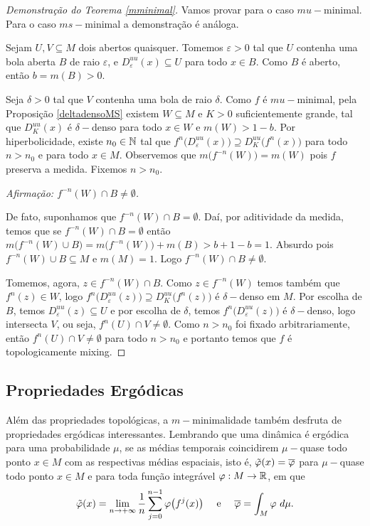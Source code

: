 \begin{proof}[Demonstração do Teorema \ref{mminimal}] Vamos provar para o caso $mu-$minimal. Para o caso $ms-$mi\-ni\-mal a demonstração é análoga.

Sejam $U,V\subseteq M$ dois abertos quaisquer. Tomemos $\varepsilon>0$ tal que $U$ contenha uma bola aberta $B$ de raio $\varepsilon$, e $D^{uu}_{\varepsilon}(x)\subseteq U$ para todo $x\in B$. Como $B$ é aberto, então $b=m(B)>0$.

Seja $\delta>0$ tal que $V$ contenha uma bola de raio $\delta$. Como $f$ é $mu-$minimal, pela Proposição \ref{deltadensoMS} existem $W\subseteq M$ e $K>0$ suficientemente grande, tal que $D^{uu}_{K}(x)$ é $\delta-$denso para todo $x\in W$ e $m(W)>1-b$. Por hiperbolicidade, existe $n_0\in\mathbb{N}$ tal que $f^{n}\big(D^{uu}_{\varepsilon}(x)\big)\supseteq D^{uu}_{K}\big(f^n(x)\big)$ para todo $n>n_0$ e para todo $x\in M$. Observemos que $m\big(f^{-n}(W)\big)=m(W)$ pois $f$ preserva a medida. Fixemos $n>n_0$.

\textit{Afirmação: $f^{-n}(W)\cap B\neq\emptyset$.} 

De fato, suponhamos que $f^{-n}(W)\cap B=\emptyset$. Daí, por aditividade da medida, temos que se $f^{-n}(W)\cap B=\emptyset$ então $m\big(f^{-n}(W)\cup B\big)=m\big(f^{-n}(W)\big)+m(B)>b+1-b=1$. Absurdo pois $f^{-n}(W)\cup B\subseteq M$ e $m(M)=1$. Logo $f^{-n}(W)\cap B\neq\emptyset$. 

Tomemos, agora, $z\in f^{-n}(W)\cap B$. Como $z\in f^{-n}(W)$ temos também que $f^n(z)\in W$, logo $f^{n}\big(D^{uu}_{\varepsilon}(z)\big)\supseteq D^{uu}_{K}\big(f^{n}(z)\big)$ é $\delta-$denso em $M$. Por escolha de $B$, temos $D^{uu}_{\varepsilon}(z)\subseteq U$ e por escolha de $\delta$, temos $f^{n}\big(D^{uu}_{\varepsilon}(z)\big)$ é $\delta-$denso, logo intersecta $V$, ou seja, $f^n(U)\cap V\neq\emptyset$. Como $n>n_0$ foi fixado arbitrariamente, então $f^n(U)\cap V\neq\emptyset$ para todo $n>n_0$ e portanto temos que $f$ é topologicamente mixing.
\end{proof}

\subsection{Propriedades Ergódicas}

Além das propriedades topológicas, a $m-$minimalidade também desfruta de propriedades ergódicas interessantes. Lembrando que uma dinâmica é ergódica para uma probabilidade $\mu$, se as médias temporais coincidirem $\mu-$quase todo ponto $x\in M$ com as respectivas médias espaciais, isto é, $\tilde{\varphi}(x)=\overline{\varphi}$ para $\mu-$quase todo ponto $x\in M$ e para toda função integrável $\varphi:M\to\mathbb{R}$, em que 
\begin{equation*}
\tilde{\varphi}(x)=\lim_{n\to+\infty}\dfrac{1}{n}\sum_{j=0}^{n-1}{\varphi\big(f^j(x)\big)}\quad\text{ e }\quad \overline{\varphi}=\int_{M}\varphi\ d\mu.
\end{equation*}

